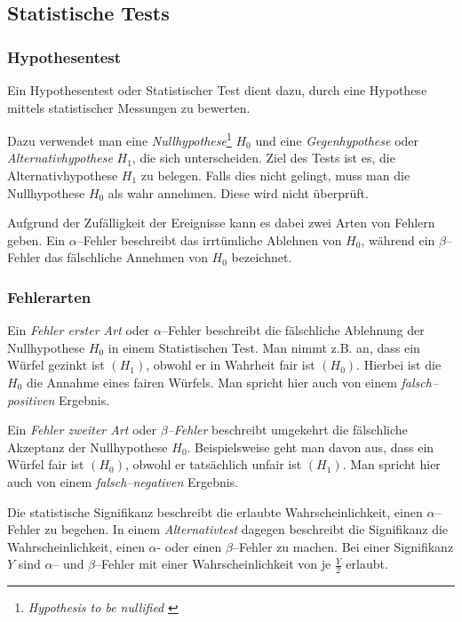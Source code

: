 \documentclass[12pt,a4paper]{scrartcl}
\numberwithin{equation}{section} %
\begin{document}
\hypertarget{statistische-tests}{%
\subsection{Statistische Tests}\label{statistische-tests}}

\hypertarget{hypothesentest}{%
\subsubsection{Hypothesentest}\label{hypothesentest}}

Ein Hypothesentest oder Statistischer Test dient dazu, durch eine Hypothese mittels statistischer Messungen zu bewerten.

Dazu verwendet man eine \emph{Nullhypothese}\footnote{\emph{Hypothesis  to be nullified} \cite{Gigerenzer}} $H_0$ und eine \emph{Gegenhypothese} oder \emph{Alternativhypothese} $H_1$, die sich unterscheiden. Ziel des Tests ist es, die Alternativhypothese $H_1$ zu belegen. Falls dies nicht gelingt, muss man die Nullhypothese $H_0$ als wahr annehmen. Diese wird nicht überprüft. \cite{Statistical Inference}

Aufgrund der Zufälligkeit der Ereignisse kann es dabei zwei Arten von Fehlern geben. Ein $\alpha$--Fehler beschreibt das irrtümliche Ablehnen von $H_0$, während ein $\beta$--Fehler das fälschliche Annehmen von $H_0$ bezeichnet.

\hypertarget{fehlerarten}{%
\subsubsection{Fehlerarten}\label{fehlerarten}}
Ein \emph{Fehler erster Art} oder $\alpha$--Fehler beschreibt die fälschliche Ablehnung der Nullhypothese $H_0$ in einem Statistischen Test. Man nimmt z.B. an, dass ein Würfel gezinkt ist $(H_1)$, obwohl er in Wahrheit fair ist $(H_0)$. Hierbei ist die $H_0$ die Annahme eines fairen Würfels. Man spricht hier auch von einem \emph{falsch--positiven} Ergebnis. \cite{Statistical Inference}

Ein \emph{Fehler zweiter Art} oder \emph{$\beta$--Fehler} beschreibt umgekehrt die fälschliche Akzeptanz der Nullhypothese $H_0$. Beispielsweise geht man davon aus, dass ein Würfel fair ist $(H_0)$, obwohl er tatsächlich unfair ist $(H_1)$. Man spricht hier auch von einem \emph{falsch--negativen} Ergebnis. \cite{Statistical Inference}

Die statistische Signifikanz beschreibt die erlaubte Wahrscheinlichkeit, einen $\alpha$--Fehler zu begehen. \cite{Statistical Inference} In einem \emph{Alternativtest} dagegen beschreibt die Signifikanz die Wahrscheinlichkeit, einen $\alpha$- oder einen $\beta$--Fehler zu machen. Bei einer Signifikanz $Y$ sind $\alpha$-- und $\beta$--Fehler mit einer Wahrscheinlichkeit von je $\frac{Y}{2}$ erlaubt.
\end{document}
